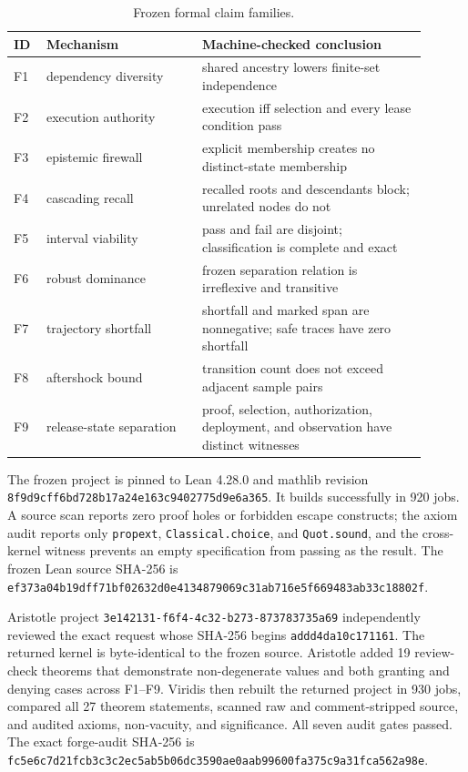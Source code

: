 \documentclass[10pt]{article}
\newcommand{\hashfour}[4]{\texttt{#1}\allowbreak\texttt{#2}\allowbreak\texttt{#3}\allowbreak\texttt{#4}}
\begin{document}
\begin{table}[h]
\centering\small
\begin{tabular}{@{}p{0.07\linewidth}p{0.34\linewidth}p{0.49\linewidth}@{}}
\toprule
ID & Mechanism & Machine-checked conclusion \\
\midrule
F1 & dependency diversity & shared ancestry lowers finite-set independence \\
F2 & execution authority & execution iff selection and every lease condition pass \\
F3 & epistemic firewall & explicit membership creates no distinct-state membership \\
F4 & cascading recall & recalled roots and descendants block; unrelated nodes do not \\
F5 & interval viability & pass and fail are disjoint; classification is complete and exact \\
F6 & robust dominance & frozen separation relation is irreflexive and transitive \\
F7 & trajectory shortfall & shortfall and marked span are nonnegative; safe traces have zero shortfall \\
F8 & aftershock bound & transition count does not exceed adjacent sample pairs \\
F9 & release-state separation & proof, selection, authorization, deployment, and observation have distinct witnesses \\
\bottomrule
\end{tabular}
\caption{Frozen formal claim families.}
\label{tab:formal}
\end{table}

The frozen project is pinned to Lean 4.28.0 and mathlib revision
\texttt{8f9d9cff6bd728b17a24e163c9402775d9e6a365}. It builds successfully in 920
jobs. A source scan reports zero proof holes or forbidden escape constructs;
the axiom audit reports only \texttt{propext}, \texttt{Classical.choice}, and
\texttt{Quot.sound}, and the cross-kernel witness prevents an empty
specification from passing as the result. The frozen Lean source SHA-256 is
\hashfour{ef373a04b19dff71}{bf02632d0e413487}{9069c31ab716e5f6}{69483ab33c18802f}.

Aristotle project
\texttt{3e142131-f6f4-4c32-b273-873783735a69} independently reviewed the exact
request whose SHA-256 begins \texttt{addd4da10c171161}. The returned kernel is
byte-identical to the frozen source. Aristotle added 19 review-check theorems
that demonstrate non-degenerate values and both granting and denying cases
across F1--F9. Viridis then rebuilt the returned project in 930 jobs, compared
all 27 theorem statements, scanned raw and comment-stripped source, and audited
axioms, non-vacuity, and significance. All seven audit gates passed. The exact
forge-audit SHA-256 is
\hashfour{fc5e6c7d21fcb3c3}{c2ec5ab5b06dc359}{0ae0aab99600fa37}{5c9a31fca562a98e}.
\end{document}

